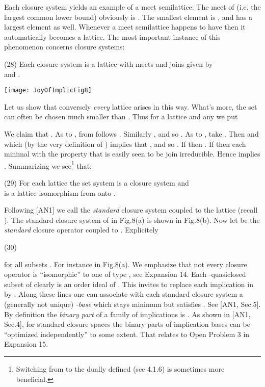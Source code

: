 \documentclass[11pt]{article}
\begin{document}
Each closure system  yields an example of a meet semilattice: The meet of  (i.e. the largest common lower bound) obviously is . The smallest element is , and  has a largest element  as well. Whenever a meet semilattice  happens to have  then it automatically becomes a lattice. The most important instance of this phenomenon concerns closure systems:

(28) \quad Each closure system  is a lattice  with meets and joins given by\\
\hspace*{1cm}  and .


\begin{center}
\texttt{[image: JoyOfImplicFig8]}
\end{center}


Let us show that conversely {\it every} lattice  arises in this way. What's more, the set  can often be chosen much smaller than . Thus for a lattice  and any  we put

We claim that . As to , from  follows . Similarly , and so . As to , take . Then  and  which (by the very definition of ) implies that , and so . If  then . If  then each  minimal with the property that  is easily seen to be join irreducible. Hence  implies . Summarizing we see\footnote{Switching from  to the dually defined  (see 4.1.6) is sometimes more beneficial.} that:

(29) \quad For each lattice  the set system  is a closure system and \\
\hspace*{1cm} is a lattice isomorphism from  onto .

Following [AN1] we call  the {\it standard} closure system coupled to the lattice  (recall ). The standard closure system  of  in Fig.8(a) is shown in Fig.8(b). Now let  be the {\it standard} closure operator coupled to . Explicitely

(30) \quad 

for all subsets .  For instance  in Fig.8(a). 
We emphasize that not every closure operator  is ``isomorphic'' to one of type , see Expansion 14. Each -quasiclosed subset of  clearly is an order ideal of .  This invites to replace each implication  in  by . Along these lines one can associate with each standard closure system  a (generally not unique) {\it -base}  which stays minimum but satisfies . See [AN1, Sec.5]. By definition the {\it binary part} of a family  of implications is . As shown in [AN1, Sec.4], for standard closure spaces the binary parts of implication bases can be ``optimized independently'' to some extent. That relates to Open Problem 3 in Expansion 15.
\end{document}
